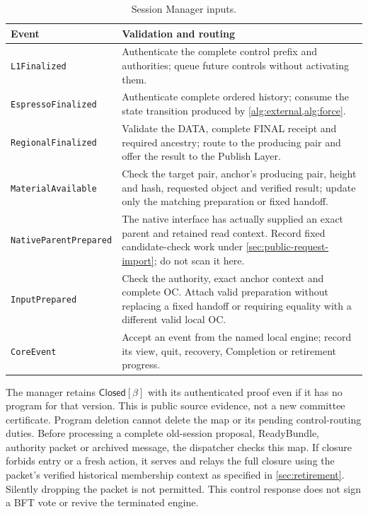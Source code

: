 \documentclass[11pt,a4paper]{article}
\newcommand{\tagg}[1]{\ensuremath{\mathsf{#1}}}
\begin{document}
\begin{table}[htbp]\centering\small
\caption{Session Manager inputs.}
\label{tab:manager-inputs}
\begin{tabularx}{\linewidth}{@{}>{\raggedright\arraybackslash}p{.24\linewidth}Y@{}}\toprule
Event & Validation and routing\\\midrule
\texttt{L1Finalized} & Authenticate the complete control prefix and
authorities; queue future controls without activating them.\\
\texttt{EspressoFinalized} & Authenticate complete ordered history;
consume the state transition produced by \cref{alg:external,alg:force}.\\
\texttt{RegionalFinalized} & Validate the DATA, complete FINAL receipt
and required ancestry; route to the producing pair and offer the result
to the Publish Layer.\\
\texttt{MaterialAvailable} & Check the target pair, anchor's producing
pair, height and hash, requested object and verified result; update only
the matching preparation or fixed handoff.\\
\texttt{NativeParentPrepared} & The native interface has actually supplied
an exact parent and retained read context. Record fixed candidate-check
work under \cref{sec:public-request-import}; do not scan it here.\\
\texttt{InputPrepared} & Check the authority, exact anchor context and
complete OC. Attach valid preparation without replacing a fixed handoff
or requiring equality with a different valid local OC.\\
\texttt{CoreEvent} & Accept an event from the named local engine;
record its view, quit, recovery, Completion or retirement progress.\\\bottomrule
\end{tabularx}
\end{table}

The manager retains $\tagg{Closed}[\beta]$ with its authenticated proof
even if it has no program for that version. This is public source evidence,
not a new committee certificate. Program deletion cannot delete the map
or its pending control-routing duties. Before processing a complete
old-session proposal, ReadyBundle, authority packet or archived message,
the dispatcher checks this map. If closure forbids entry or a fresh
action, it serves and relays the full closure using the packet's verified
historical membership context as specified in \cref{sec:retirement}.
Silently dropping the packet is not permitted. This control response
does not sign a BFT vote or revive the terminated engine.
\end{document}
